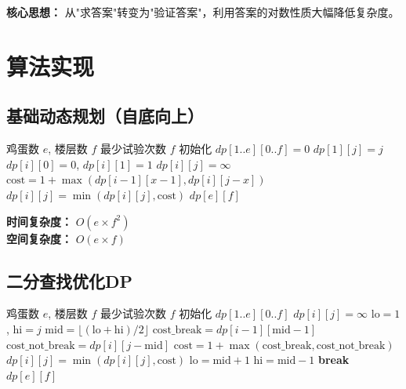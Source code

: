 \documentclass[12pt,a4paper]{article}
\begin{document}
\textbf{核心思想：} 从"求答案"转变为"验证答案"，利用答案的对数性质大幅降低复杂度。

\section{算法实现}

\subsection{基础动态规划（自底向上）}

\begin{algorithm}[H]
\caption{基础动态规划}
\begin{algorithmic}[1]
\REQUIRE 鸡蛋数 $e$, 楼层数 $f$
\ENSURE 最少试验次数
\ENDIF
{}
    \RETURN $f$
\ENDIF
\STATE 初始化 $dp[1..e][0..f] = 0$
    \STATE $dp[1][j] = j$ 
\ENDFOR
{}
    \STATE $dp[i][0] = 0$, $dp[i][1] = 1$
\ENDFOR
{}
        \STATE $dp[i][j] = \infty$
            \STATE $\text{cost} = 1 + \max(dp[i-1][x-1], dp[i][j-x])$
            \STATE $dp[i][j] = \min(dp[i][j], \text{cost})$
        \ENDFOR
    \ENDFOR
\ENDFOR
\RETURN $dp[e][f]$
\end{algorithmic}
\end{algorithm}

\textbf{时间复杂度：} $O(e \times f^2)$ \\
\textbf{空间复杂度：} $O(e \times f)$

\subsection{二分查找优化DP}

\begin{algorithm}[H]
\caption{二分查找优化DP}
\begin{algorithmic}[1]
\REQUIRE 鸡蛋数 $e$, 楼层数 $f$
\ENSURE 最少试验次数
\ENDIF
{}
    \RETURN $f$
\ENDIF
\STATE 初始化 $dp[1..e][0..f]$
        \STATE $dp[i][j] = \infty$
        \STATE $\text{lo} = 1$, $\text{hi} = j$
            \STATE $\text{mid} = \lfloor(\text{lo} + \text{hi}) / 2\rfloor$
            \STATE $\text{cost\_break} = dp[i-1][\text{mid}-1]$
            \STATE $\text{cost\_not\_break} = dp[i][j-\text{mid}]$
            \STATE $\text{cost} = 1 + \max(\text{cost\_break}, \text{cost\_not\_break})$
            \STATE $dp[i][j] = \min(dp[i][j], \text{cost})$
                \STATE $\text{lo} = \text{mid} + 1$
                \STATE $\text{hi} = \text{mid} - 1$
            \ELSE
                \STATE \textbf{break}
            \ENDIF
        \ENDWHILE
    \ENDFOR
\ENDFOR
\RETURN $dp[e][f]$
\end{algorithmic}
\end{algorithm}
\end{document}
